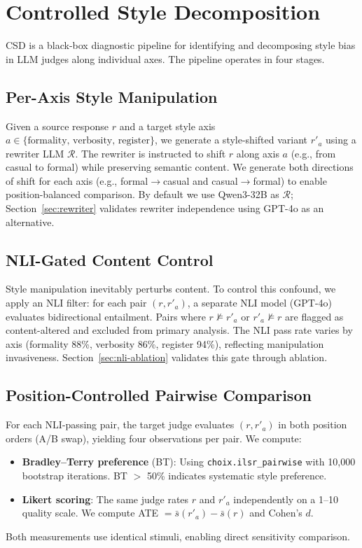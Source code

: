 \documentclass[11pt,a4paper]{article}
\newcommand{\csd}{\textsc{CSD}}
\begin{document}
\section{Controlled Style Decomposition}

\csd{} is a black-box diagnostic pipeline for identifying and decomposing style bias in LLM judges along individual axes. The pipeline operates in four stages.

\subsection{Per-Axis Style Manipulation}

Given a source response $r$ and a target style axis $a \in \{\text{formality, verbosity, register}\}$, we generate a style-shifted variant $r'_a$ using a rewriter LLM $\mathcal{R}$. The rewriter is instructed to shift $r$ along axis $a$ (e.g., from casual to formal) while preserving semantic content. We generate both directions of shift for each axis (e.g., formal$\to$casual and casual$\to$formal) to enable position-balanced comparison. By default we use Qwen3-32B as $\mathcal{R}$; Section~\ref{sec:rewriter} validates rewriter independence using GPT-4o as an alternative.

\subsection{NLI-Gated Content Control}

Style manipulation inevitably perturbs content. To control this confound, we apply an NLI filter: for each pair $(r, r'_a)$, a separate NLI model (GPT-4o) evaluates bidirectional entailment. Pairs where $r \not\models r'_a$ or $r'_a \not\models r$ are flagged as content-altered and excluded from primary analysis. The NLI pass rate varies by axis (formality 88\%, verbosity 86\%, register 94\%), reflecting manipulation invasiveness. Section~\ref{sec:nli-ablation} validates this gate through ablation.

\subsection{Position-Controlled Pairwise Comparison}

For each NLI-passing pair, the target judge evaluates $(r, r'_a)$ in both position orders (A/B swap), yielding four observations per pair. We compute:
\begin{itemize}
    \item \textbf{Bradley--Terry preference} (BT): Using \texttt{choix.ilsr\_pairwise} with 10,000 bootstrap iterations. BT $>$ 50\% indicates systematic style preference.
    \item \textbf{Likert scoring}: The same judge rates $r$ and $r'_a$ independently on a 1--10 quality scale. We compute ATE $= \bar{s}(r'_a) - \bar{s}(r)$ and Cohen's $d$.
\end{itemize}
Both measurements use identical stimuli, enabling direct sensitivity comparison.
\end{document}
